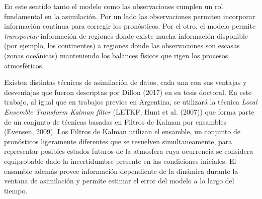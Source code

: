 \documentclass[12pt,oneside,a4paper]{reedthesis}
\begin{document}
En este sentido tanto el modelo como las observaciones cumplen un rol fundamental en la asimilación. Por un lado las observaciones permiten incorporar información continua para corregir los pronósticos. Por el otro, el modelo permite \emph{transportar} información de regiones donde existe mucha información disponible (por ejemplo, los continentes) a regiones donde las observaciones son escasas (zonas oceánicas) manteniendo los balances físicos que rigen los procesos atmosféricos.

Existen distintas técnicas de asimilación de datos, cada una con sus ventajas y desventajas que fueron descriptas por Dillon (2017) en su tesis doctoral. En este trabajo, al igual que en trabajos previos en Argentina, se utilizará la técnica \emph{Local Ensemble Transform Kalman filter} (LETKF, Hunt et al. (2007)) que forma parte de un conjunto de técnicas basadas en Filtros de Kalman por ensambles (Evensen, 2009). Los Filtros de Kalman utilizan el ensamble, un conjunto de pronósticos ligeramente diferentes que se resuelven simultaneamente, para representar posibles estados futuros de la atmosfera cuya ocurrencia se considera equiprobable dado la incertidumbre presente en las condiciones iniciales. El ensamble además provee información dependiente de la dinámica durante la ventana de asimilación y permite estimar el error del modelo a lo largo del tiempo.
\end{document}
